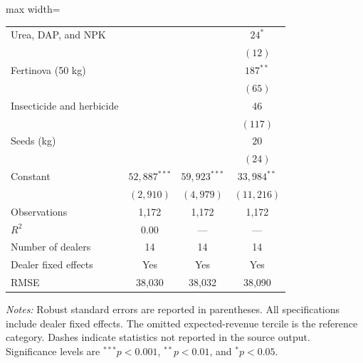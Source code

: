 \documentclass[11pt]{article}
\begin{document}
\begin{table}[!htbp]
\begin{threeparttable}
\begin{adjustbox}{max width=\textwidth}
\begin{tabular}{lccc}
Urea, DAP, and NPK
    & & & $24^{*}$ \\
    & & & $(12)$ \\

Fertinova (50 kg)
    & & & $187^{**}$ \\
    & & & $(65)$ \\

Insecticide and herbicide
    & & & $46$ \\
    & & & $(117)$ \\

Seeds (kg)
    & & & $20$ \\
    & & & $(24)$ \\

\addlinespace
Constant
    & $52{,}887^{***}$
    & $59{,}923^{***}$
    & $33{,}984^{**}$ \\
    & $(2{,}910)$
    & $(4{,}979)$
    & $(11{,}216)$ \\

\midrule
Observations
    & 1,172 & 1,172 & 1,172 \\
$R^{2}$
    & 0.00 & --- & --- \\
Number of dealers
    & 14 & 14 & 14 \\
Dealer fixed effects
    & Yes & Yes & Yes \\
RMSE
    & 38,030 & 38,032 & 38,090 \\
\bottomrule
\end{tabular}
\end{adjustbox}

\begin{tablenotes}[flushleft]
\footnotesize
\item \textit{Notes:} Robust standard errors are reported in parentheses.
All specifications include dealer fixed effects. The omitted expected-revenue
tercile is the reference category. Dashes indicate statistics not reported in
the source output. Significance levels are $^{***}p<0.001$,
$^{**}p<0.01$, and $^{*}p<0.05$.
\end{tablenotes}

\end{threeparttable}
\end{table}
\end{document}
